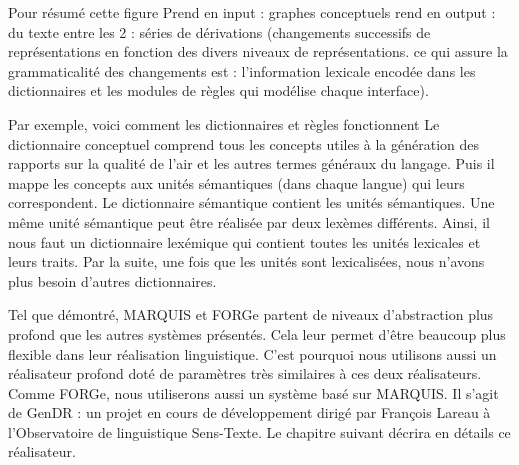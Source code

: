 Pour résumé cette figure
Prend en input : graphes conceptuels 
rend en output : du texte
entre les 2 : séries de dérivations (changements successifs de représentations en fonction des divers niveaux de représentations. ce qui assure la grammaticalité des changements est : l'information lexicale encodée dans les dictionnaires et les modules de règles qui modélise chaque interface).

Par exemple, voici comment les dictionnaires et règles fonctionnent 
Le dictionnaire conceptuel comprend tous les concepts utiles à la génération des rapports sur la qualité de l'air et les autres termes généraux du langage. Puis il mappe les concepts aux unités sémantiques (dans chaque langue) qui leurs correspondent. Le dictionnaire sémantique contient les unités sémantiques. Une même unité sémantique peut être réalisée par deux lexèmes différents. Ainsi, il nous faut un dictionnaire lexémique qui contient toutes les unités lexicales et leurs traits. Par la suite, une fois que les unités sont lexicalisées, nous n'avons plus besoin d'autres dictionnaires. 

Tel que démontré, MARQUIS et FORGe partent de niveaux d'abstraction plus profond que les autres systèmes présentés. Cela leur permet d'être beaucoup plus flexible dans leur réalisation linguistique. C'est pourquoi nous utilisons aussi un réalisateur profond doté de paramètres très similaires à ces deux réalisateurs. Comme FORGe, nous utiliserons aussi un système basé sur MARQUIS. Il s'agit de GenDR \citep{lareau18}: un projet en cours de développement dirigé par François Lareau à l’Observatoire de linguistique Sens-Texte. Le chapitre suivant décrira en détails ce réalisateur.